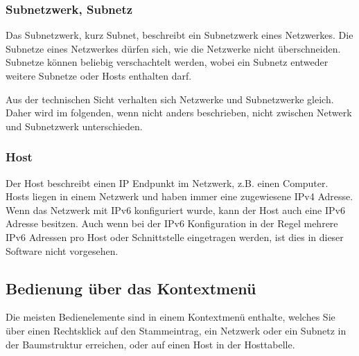 \subsubsection{Subnetzwerk, Subnetz}
Das Subnetzwerk, kurz Subnet, beschreibt ein Subnetzwerk eines Netzwerkes. Die
Subnetze eines Netzwerkes dürfen sich, wie die Netzwerke nicht überschneiden.
Subnetze können beliebig verschachtelt werden, wobei ein Subnetz entweder
weitere Subnetze oder Hosts enthalten darf.

Aus der technischen Sicht verhalten sich Netzwerke und Subnetzwerke gleich.
Daher wird im folgenden, wenn nicht anders beschrieben, nicht zwischen Netwerk
und Subnetzwerk unterschieden.

\subsubsection{Host}
Der Host beschreibt einen IP Endpunkt im Netzwerk, z.B. einen Computer. Hosts
liegen in einem  Netzwerk und haben immer eine zugewiesene IPv4 Adresse.
Wenn das Netzwerk mit IPv6 konfiguriert wurde, kann der Host auch eine IPv6
Adresse besitzen. Auch wenn bei der IPv6 Konfiguration in der Regel mehrere IPv6
Adressen pro Host oder Schnittstelle eingetragen werden, ist dies in dieser Software
nicht vorgesehen.

\subsection{Bedienung über das Kontextmenü}
Die meisten Bedienelemente sind in einem Kontextmenü enthalte, welches Sie über
einen Rechtsklick auf den Stammeintrag, ein Netzwerk oder ein Subnetz in der
Baumstruktur erreichen, oder auf einen Host in der Hosttabelle.